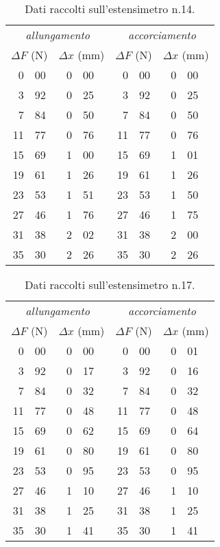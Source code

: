 \begin{table}[hp]\caption{Dati raccolti sull'estensimetro n.14.}\label{tab14}
\centering \small
\begin{tabular}{*4{r@{.}l}}
\multicolumn{4}{c}{\emph{allungamento}} & \multicolumn{4}{c}{\emph{accorciamento}}\\
\multicolumn{2}{c}{$\Delta F$ (\unit{N})}
&\multicolumn{2}{c}{$\Delta x$ (\unit{mm})}
&\multicolumn{2}{c}{$\Delta F$ (\unit{N})}
&\multicolumn{2}{c}{$\Delta x$ (\unit{mm})}\\\hline
0&00 &0&00 &0&00 &0&00\\
3&92 &0&25 &3&92 &0&25\\
7&84 &0&50 &7&84 &0&50\\
11&77 &0&76 &11&77 &0&76\\
15&69 &1&00 &15&69 &1&01\\
19&61 &1&26 &19&61 &1&26\\
23&53 &1&51 &23&53 &1&50\\
27&46 &1&76 &27&46 &1&75\\
31&38 &2&02 &31&38 &2&00\\
35&30 &2&26 &35&30 &2&26\\
\end{tabular}
\end{table}
\begin{table}[hp]\caption{Dati raccolti sull'estensimetro n.17.}\label{tab17}
\centering \small
\begin{tabular}{*4{r@{.}l}}
\multicolumn{4}{c}{\emph{allungamento}} & \multicolumn{4}{c}{\emph{accorciamento}}\\
\multicolumn{2}{c}{$\Delta F$ (\unit{N})}
&\multicolumn{2}{c}{$\Delta x$ (\unit{mm})}
&\multicolumn{2}{c}{$\Delta F$ (\unit{N})}
&\multicolumn{2}{c}{$\Delta x$ (\unit{mm})}\\\hline
0&00 &0&00 &0&00 &0&01\\
3&92 &0&17 &3&92 &0&16\\
7&84 &0&32 &7&84 &0&32\\
11&77 &0&48 &11&77 &0&48\\
15&69 &0&62 &15&69 &0&64\\
19&61 &0&80 &19&61 &0&80\\
23&53 &0&95 &23&53 &0&95\\
27&46 &1&10 &27&46 &1&10\\
31&38 &1&25 &31&38 &1&25\\
35&30 &1&41 &35&30 &1&41\\
\end{tabular}
\end{table}
